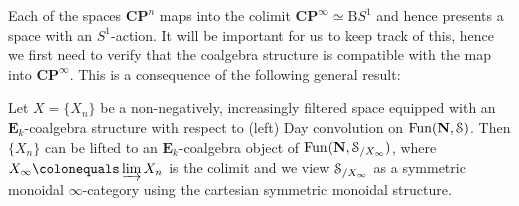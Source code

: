 \documentclass[oneside,a4paper]{amsart}
\begin{document}
Each of the spaces $\mathbf{CP}^{n}$ maps into the colimit $\mathbf{CP}^{\infty} \simeq \mathrm{B}S^{1}$ and hence presents a space with an $S^{1}$-action. It will be important for us to keep track of this, hence we first need to verify that the coalgebra structure is compatible with the map into $\mathbf{CP}^{\infty}$. This is a consequence of the following general result: 

\begin{lemma}
\label{lemma:coalgebras_in_filtered_spaces_lift_to_coalgebras_in_spaces_over_their_colimit} 
Let $X = \{ X_{n} \}$ be a non-negatively, increasingly filtered space equipped with an $\mathbf{E}_{k}$-coalgebra structure with respect to (left) Day convolution on $\mathrm{Fun}(\mathbf{N}, \EuScript{S})$. Then $\{ X_{n} \}$ can be lifted to an $\mathbf{E}_{k}$-coalgebra object of $\mathrm{Fun}(\mathbf{N}, \EuScript{S}_{/X_{\infty}})$, where $X_{\infty} \colonequals \varinjlim X_{n}$ is the colimit and we view $\EuScript{S}_{/X_{\infty}}$ as a symmetric monoidal $\infty$-category using the cartesian symmetric monoidal structure. 
\end{lemma}
\end{document}
